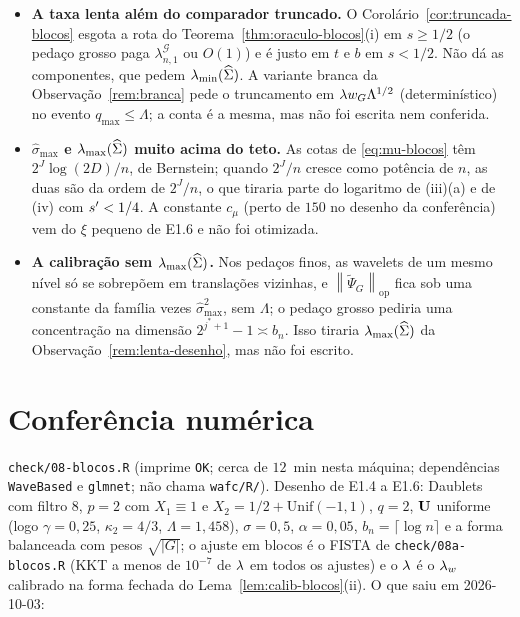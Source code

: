 \documentclass[11pt,a4paper]{article}
\newcommand{\lmin}{\lambda_{\min}}
\newcommand{\lmaxx}{\lambda_{\max}}
\newcommand{\smax}{\widehat{\sigma}_{\max}}
\newcommand{\opnorm}[1]{\left\lVert #1 \right\rVert_{\mathrm{op}}}
\newcommand{\bn}{b_{n}}
\newcommand{\Psitil}{\widetilde{\Psi}}
\newcommand{\lamGone}{\lambda^{\mathcal{G}}_{n,1}}
\newcommand{\jst}{j^{*}}
\begin{document}
\begin{itemize}[nosep, leftmargin=*]
    porque D44 não adotou essa forma.
  \item \textbf{A taxa lenta além do comparador truncado.} O
    Corolário~\ref{cor:truncada-blocos} esgota a rota do
    Teorema~\ref{thm:oraculo-blocos}(i) em $s \ge 1/2$ (o pedaço grosso paga
    $\lamGone$ ou $O(1)$) e é justo em $t$ e $b$ em $s < 1/2$. Não dá as
    componentes, que pedem $\lmin(\Gramhat)$. A variante branca da
    Observação~\ref{rem:branca} pede o truncamento em $\lambda w_{G}\Lambda^{1/2}$
    (determinístico) no evento $q_{\max} \le \Lambda$; a conta é a mesma, mas não
    foi escrita nem conferida.
  \item \textbf{$\smax$ e $\lmaxx(\Gramhat)$ muito acima do teto.} As cotas de
    \eqref{eq:mu-blocos} têm $2^{J}\log(2D)/n$, de Bernstein; quando $2^{J}/n$
    cresce como potência de $n$, as duas são da ordem de $2^{J}/n$, o que
    tiraria parte do logaritmo de (iii)(a) e de (iv) com $s' < 1/4$. A
    constante $c_{\mu}$ (perto de $150$ no desenho da conferência) vem do
    $\xi$ pequeno de E1.6 e não foi otimizada.
  \item \textbf{A calibração sem $\lmaxx(\Gramhat)$.} Nos pedaços finos, as
    wavelets de um mesmo nível só se sobrepõem em translações vizinhas, e
    $\opnorm{\Psitil_{G}}$ fica sob uma constante da família vezes
    $\smax^{2}$, sem $\Lambda$; o pedaço grosso pediria uma concentração na
    dimensão $2^{\jst+1} - 1 \asymp \bn$. Isso tiraria $\lmaxx(\Gramhat)$ da
    Observação~\ref{rem:lenta-desenho}, mas não foi escrito.
\end{itemize}

\section{Conferência numérica}

\texttt{check/08-blocos.R} (imprime \texttt{OK}; cerca de $12$~min nesta máquina;
dependências \texttt{WaveBased} e \texttt{glmnet}; não chama
\texttt{wafc/R/}). Desenho de E1.4 a E1.6: Daublets com filtro $8$, $p = 2$
com $X_{1}\equiv 1$ e $X_{2} = 1/2 + \mathrm{Unif}(-1,1)$, $q = 2$, $\mathbf{U}$
uniforme (logo $\gamma = 0{,}25$, $\kappa_{2} = 4/3$, $\Lambda = 1{,}458$),
$\sigma = 0{,}5$, $\alpha = 0{,}05$, $\bn = \lceil\log n\rceil$ e a forma
balanceada com pesos $\sqrt{|G|}$; o ajuste em blocos é o FISTA de
\texttt{check/08a-blocos.R} (KKT a menos de $10^{-7}$ de $\lambda$ em todos os
ajustes) e o $\lambda$ é o $\lambda_{w}$ calibrado na forma fechada do
Lema~\ref{lem:calib-blocos}(ii). O que saiu em 2026-10-03:
\end{document}

